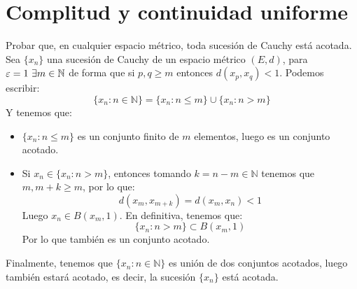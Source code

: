 \section{Complitud y continuidad uniforme}

    \begin{ejercicio}
    Probar que, en cualquier espacio métrico, toda sucesión de Cauchy está acotada.\\

    \noindent
    Sea $\{x_n\}$ una sucesión de Cauchy de un espacio métrico $(E,d)$, para $\varepsilon = 1~\exists m\in \mathbb{N}$ de forma que si $p,q\geq m$ entonces $d(x_p,x_q)<1$. Podemos escribir:
    \begin{equation*}
        \{x_n : n\in \mathbb{N}\} = \{x_n : n \leq m\} \cup \{x_n : n > m\}
    \end{equation*}
    Y tenemos que:
    \begin{itemize}
        \item $\{x_n : n\leq m\}$ es un conjunto finito de $m$ elementos, luego es un conjunto acotado.
        \item Si $x_n \in \{x_n : n > m\}$, entonces tomando $k = n-m \in \mathbb{N}$ tenemos que $m,m+k\geq m$, por lo que:
            \begin{equation*}
                d(x_m, x_{m+k}) = d(x_m, x_n) < 1
            \end{equation*}
            Luego $x_n\in B(x_m, 1)$. En definitiva, tenemos que:
            \begin{equation*}
                \{x_n : n > m\} \subset B(x_m, 1)
            \end{equation*}
            Por lo que también es un conjunto acotado.
    \end{itemize}
    Finalmente, tenemos que $\{x_n : n\in \mathbb{N}\}$ es unión de dos conjuntos acotados, luego también estará acotado, es decir, la sucesión $\{x_n\}$ está acotada.
    \end{ejercicio}
    
